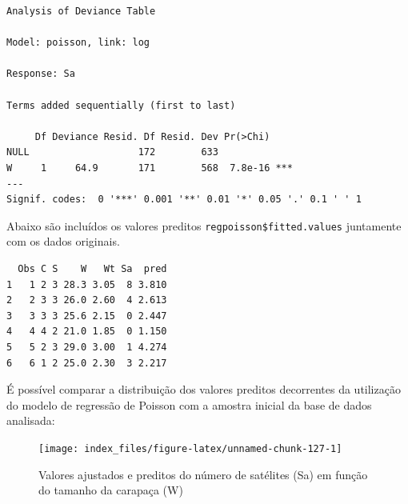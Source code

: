 \documentclass[12pt,brazil,oneside]{book}
\newenvironment{Shaded}{\begin{snugshade}}{\end{snugshade}}
\newcommand{\DataTypeTok}[1]{\textcolor[rgb]{0.13,0.29,0.53}{#1}}
\newcommand{\KeywordTok}[1]{\textcolor[rgb]{0.13,0.29,0.53}{\textbf{#1}}}
\newcommand{\NormalTok}[1]{#1}
\newcommand{\OperatorTok}[1]{\textcolor[rgb]{0.81,0.36,0.00}{\textbf{#1}}}
\newcommand{\StringTok}[1]{\textcolor[rgb]{0.31,0.60,0.02}{#1}}
\begin{document}
\begin{verbatim}
Analysis of Deviance Table

Model: poisson, link: log

Response: Sa

Terms added sequentially (first to last)

     Df Deviance Resid. Df Resid. Dev Pr(>Chi)    
NULL                   172        633             
W     1     64.9       171        568  7.8e-16 ***
---
Signif. codes:  0 '***' 0.001 '**' 0.01 '*' 0.05 '.' 0.1 ' ' 1
\end{verbatim}

Abaixo são incluídos os valores preditos \texttt{regpoisson\$fitted.values} juntamente com os dados originais.

\begin{Shaded}
\end{Shaded}

\begin{verbatim}
  Obs C S    W   Wt Sa  pred
1   1 2 3 28.3 3.05  8 3.810
2   2 3 3 26.0 2.60  4 2.613
3   3 3 3 25.6 2.15  0 2.447
4   4 4 2 21.0 1.85  0 1.150
5   5 2 3 29.0 3.00  1 4.274
6   6 1 2 25.0 2.30  3 2.217
\end{verbatim}

É possível comparar a distribuição dos valores preditos decorrentes da utilização do modelo de regressão de Poisson com a amostra inicial da base de dados analisada:

\begin{Shaded}
\end{Shaded}

\begin{figure}[H]

{\centering \texttt{[image: index\_files/figure-latex/unnamed-chunk-127-1]} 

}

\caption{Valores ajustados e preditos do número de satélites (Sa) em função do tamanho da carapaça (W)}\label{fig:unnamed-chunk-127}
\end{figure}
\end{document}
